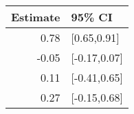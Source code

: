 \begin{tabular}{rl}
  \hline
Estimate & 95\% CI \\ 
  \hline
0.78 & [0.65,0.91] \\ 
  -0.05 & [-0.17,0.07] \\ 
  0.11 & [-0.41,0.65] \\ 
  0.27 & [-0.15,0.68] \\ 
   \hline
\end{tabular}

